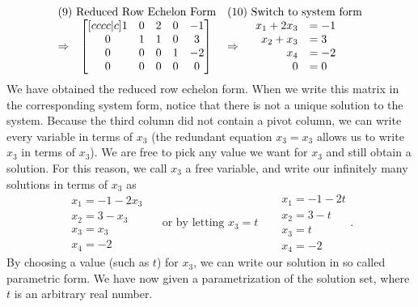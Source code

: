 \begin{example}
{$$\begin{array}{rlcl}
\\ \\ 
\multicolumn{2}{l}{\text{(9) Reduced Row Echelon Form}}&
\multicolumn{2}{l}{\text{(10) Switch to system form}}\\
\Rightarrow&
\begin{bmatrix}[cccc|c]
  1 & 0 & 2 & 0 & -1 \\
 0 & 1 & 1 & 0 & 3 \\
 0 & 0 & 0 & 1 & -2 \\
 0 & 0 & 0 & 0 & 0
\end{bmatrix}
&\Rightarrow& 
\begin{array}{rl}
x_1+2x_3&=-1\\
x_2+x_3&=3\\
x_4&=-2\\
0&=0
\end{array}
\end{array}
$$}We have obtained the reduced row echelon form. 
When we write this matrix in the corresponding system form, notice that there is not a unique solution to the system. Because the third column did not contain a pivot column, we can write every variable in terms of $x_3$ (the redundant equation $x_3=x_3$ allows us to write $x_3$ in terms of $x_3$). We are free to pick any value we want for $x_3$ and still obtain a solution. For this reason, we call $x_3$ a free variable,  and write our infinitely many solutions in terms of $x_3$ as 
$$
\begin{array}{ll}
x_1=-1-2x_3\\
x_2=3-x_3\\
x_3=x_3\\
x_4=-2
\end{array}
\quad \text{ or by letting $x_3=t$ }\quad
\begin{array}{ll}
x_1=-1-2t\\
x_2=3-t\\
x_3=t\\
x_4=-2
\end{array}
.
$$
By choosing a value (such as $t$) for $x_3$, we can write our solution in so called parametric form. We have now given a parametrization of the solution set, where $t$ is an arbitrary real number. 
\end{example}




